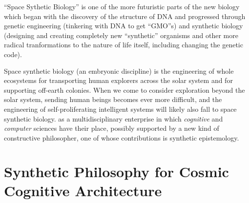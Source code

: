 \documentclass[14pt,titlepage]{extarticle}
\begin{document}
``Space Sythetic Biology'' is one of the more futuristic parts of the new biology which began with the discovery of the structure of DNA and progressed through genetic engineering (tinkering with DNA to get ``GMO''s) and synthetic biology (designing and creating completely new ``synthetic'' organisms and other more radical tranformations to the nature of life itself, including changing the genetic code).

Space synthetic biology (an embryonic discipline) is the engineering of whole ecosystems for transporting human explorers across the solar system and for supporting off-earth colonies.
When we come to consider exploration beyond the solar system, sending human beings becomes ever more difficult, and the engineering of self-proliferating intelligent systems will likely also fall to space synthetic biology.
 as a multidisciplinary enterprise in which \emph{cognitive} and \emph{computer} sciences have their place, possibly supported by a new kind of constructive philosopher, one of whose contributions is synthetic epistemology.


\section{Synthetic Philosophy for Cosmic Cognitive Architecture}





%
%






\end{document}
